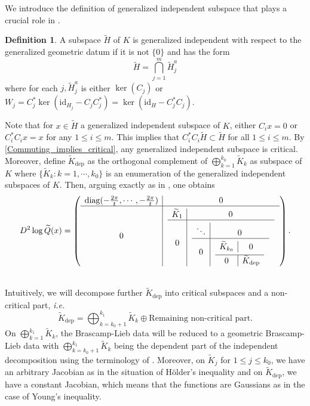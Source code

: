 \documentclass[11pt,a4paper,reqno]{amsart}
\numberwithin{equation}{section}
\theoremstyle{definition}
\newtheorem{definition}[theorem]{Definition}
\newcommand{\nm}{\noalign{\smallskip}}
\renewcommand{\tilde}{\widetilde}
\newcommand{\<}{\ensuremath \leq}
\renewcommand{\>}{\ensuremath \geq}
\renewcommand{\tilde}{\widetilde}
\begin{document}
We introduce the definition of generalized independent subspace that plays a crucial role in \cite{Vald2}. 

\begin{definition}
    A subspace $\tilde H$ of $K$ is generalized independent with respect to the generalized geometric datum if it is not $\{0\}$ and has the form $$\tilde H=\bigcap_{j=1}^m \tilde H_j^{a}$$ where for each $j, \tilde H_j^a$ is either $\ker(C_j)$ or $W_j=C_j^*\ker(\mathrm{id}_{H_j}-C_jC_j^*)=\ker(\mathrm{id}_H-C_j^*C_j).$ 
\end{definition}

Note that for $x \in \tilde H$ a generalized independent subspace of $K$, either $C_ix=0$ or $C_i^*C_ix=x$ for any $1 \leq i \leq m$. This implies that $C_i^*C_i \tilde H \subset \tilde H$ for all $1 \leq i \leq m.$ By \cref{Commuting_implies_critical}, any generalized independent subspace is critical. 
\hfill \\

Moreover, define $\tilde K_{\mathrm{dep}}$ as the orthogonal complement of $\bigoplus_{k=1}^{k_0}\tilde K_k$ as subspace of $K$ where $\{\tilde K_k : k=1,\cdots,k_0\}$ is an enumeration of the generalized independent subspaces of $K$. Then, arguing exactly as in \cite[Lemma 13]{Vald2}, one obtains $$D^2\log \tilde Q(x)=\left(\begin{array}{ c | c }
    \mathrm{diag}(-\frac{2\pi}{t},\cdots,-\frac{2\pi}{t}) & 0 \\
    \hline
    0 & \left. \begin{array}{ c | c } 
    \nm
    \tilde K_1   & 0   \\ 
    \hline
    0 &  \left. \begin{array}{c | c} \nm \ddots & 0 \\
    \hline
    0 & \left. \begin{array}{c | c} \nm \tilde K_{k_0} & 0 \\
    \nm
    \hline
     0 & \tilde K_{\mathrm{dep}}  \end{array} \right.  \end{array} \right. 
    \end{array} \right.
  
  \end{array}\right) .$$

\hfill \\



Intuitively, we will decompose further $\tilde K_{\mathrm{dep}}$ into critical subspaces and a non-critical part, \textit{i.e.} $$\tilde K_{\mathrm{dep}}=\bigoplus_{k=k_0+1}^{k_1}\tilde K_k \oplus \text{Remaining non-critical part}.$$ On $\bigoplus_{k=1}^{k_1}\tilde K_k$, the Brascamp-Lieb data will be reduced to a geometric Brascamp-Lieb data with $\bigoplus_{k=k_0+1}^{k_1}\tilde K_k$ being the dependent part of the independent decomposition using the terminology of \cite{Vald2}. Moreover, on $\tilde K_j$ for $1 \leq j \leq k_0$, we have an arbitrary Jacobian as in the situation of Hölder's inequality and on $\tilde K_{\mathrm{dep}}$, we have a constant Jacobian, which means that the functions are Gaussians as in the case of Young's inequality. 
\end{document}
